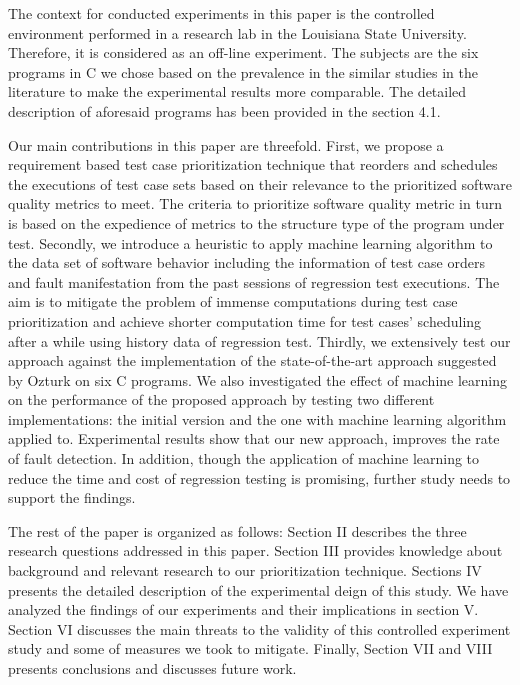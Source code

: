 \documentclass{sig-alternate}
\begin{document}
The context for conducted experiments in this paper is the controlled environment performed in a research lab in the Louisiana State University. Therefore, it is considered as an off-line experiment. The subjects are the six programs in C we chose based on the prevalence in the similar studies in the literature to make the experimental results more comparable. The detailed description of aforesaid programs has been provided in the section 4.1.

Our main contributions in this paper are threefold. First, we propose a requirement based test case prioritization technique that reorders and schedules the executions of test case sets based on their relevance to the prioritized software quality metrics to meet. The criteria to prioritize software quality metric in turn is based on the expedience of metrics to the structure type of the program under test. Secondly, we introduce a heuristic to apply machine learning algorithm to the data set of software behavior including the information of test case orders and fault manifestation from the past sessions of regression test executions. The aim is to mitigate the problem of immense computations during test case prioritization and achieve shorter computation time for test cases' scheduling after a while using history data of regression test. Thirdly, we extensively test our approach against the implementation of the state-of-the-art approach suggested by Ozturk \cite{ozturk:quality} on six C programs. We also investigated the effect of machine learning on the performance of the proposed approach by testing two different implementations: the initial version and the one with machine learning algorithm applied to. Experimental results show that our new approach, improves the rate of fault detection. In addition, though the application of machine learning to reduce the time and cost of regression testing is promising, further study needs to support the findings. 

The rest of the paper is organized as follows: Section II describes the three research questions addressed in this paper. Section III provides knowledge about background and relevant research to our prioritization technique. Sections IV presents the detailed description of the experimental deign of this study. We have analyzed the findings of our experiments and their implications in section V. Section VI discusses the main threats to the validity of this controlled experiment study and some of measures we took to mitigate. Finally, Section VII and VIII presents conclusions and discusses future work.
\end{document}
